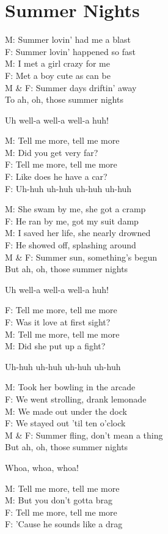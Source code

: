 \section{Summer Nights}
M: Summer lovin' had me a blast\\
F: Summer lovin' happened so fast\\
M: I met a girl crazy for me\\
F: Met a boy cute as can be\\
M \& F: Summer days driftin' away\\
To ah, oh, those summer nights

Uh well-a well-a well-a huh!

M: Tell me more, tell me more\\
M: Did you get very far? \\
F: Tell me more, tell me more\\
F: Like does he have a car?\\
F: Uh-huh uh-huh uh-huh uh-huh

M: She swam by me, she got a cramp\\
F: He ran by me, got my suit damp\\
M: I saved her life, she nearly drowned\\
F: He showed off, splashing around\\
M \& F: Summer sun, something's begun\\
But ah, oh, those summer nights

Uh well-a well-a well-a huh!

F: Tell me more, tell me more\\
F: Was it love at first sight?\\
M: Tell me more, tell me more\\
M: Did she put up a fight?

Uh-huh uh-huh uh-huh uh-huh

M: Took her bowling in the arcade\\
F: We went strolling, drank lemonade\\
M: We made out under the dock\\
F: We stayed out 'til ten o'clock\\
M \& F: Summer fling, don't mean a thing\\
But ah, oh, those summer nights

Whoa, whoa, whoa!

M: Tell me more, tell me more\\
M: But you don't gotta brag\\
F: Tell me more, tell me more\\
F: 'Cause he sounds like a drag

